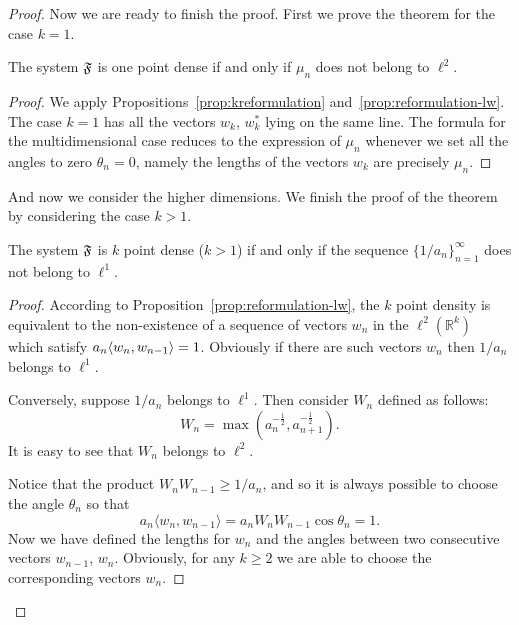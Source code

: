 \begin{proof}
    Now we are ready to finish the proof.
    First we prove the theorem for the case $k=1$.
    \begin{prop}
      The system $\mathfrak{F}$ is one point dense if and only if $\mu_n$ does not belong to $\ell^2$.
    \end{prop}
    \begin{proof}
      We apply Propositions~\ref{prop:kreformulation} and~\ref{prop:reformulation-lw}.
      The case $k=1$ has all the vectors $w_k$, $w^*_k$ lying on the same line.
      The formula for the multidimensional case reduces to the expression of $\mu_n$ whenever we set all the angles to zero $\theta_n = 0$,
        namely the lengths of the vectors $w_k$ are precisely $\mu_n$.
    \end{proof}

    And now we consider the higher dimensions.
    We finish the proof of the theorem by considering the case $k > 1$.
    \begin{prop}
      The system $\mathfrak{F}$ is $k$ point dense ($k > 1$) if and only if the sequence $\{1/a_n\}_{n=1}^\infty$ does not belong to $\ell^1$.
    \end{prop}
    \begin{proof}
      According to Proposition~\ref{prop:reformulation-lw}, the $k$ point density is equivalent to the non-existence of
        a sequence of vectors $w_n$ in the $\ell^2(\mathbb{R}^k)$ which satisfy $a_n \langle w_n, w_{n-1} \rangle = 1$.
      Obviously if there are such vectors $w_n$ then $1/a_n$ belongs to $\ell^1$.

      Conversely, suppose $1/a_n$ belongs to $\ell^1$.
      Then consider $W_n$ defined as follows:
      \[
        W_n = \max(a_n^{-\frac{1}{2}}, a^{-\frac{1}{2}}_{n+1}).
      \]
      It is easy to see that $W_n$ belongs to $\ell^2$.

      Notice that the product $W_nW_{n-1} \geq 1/a_n$, and so it is always possible to choose the angle $\theta_n$ so that
      \[
        a_n \langle w_n, w_{n-1} \rangle = a_n W_n W_{n-1}\cos{\theta_n} = 1.
      \]
      Now we have defined the lengths for $w_n$ and the angles between two consecutive vectors $w_{n-1}$, $w_n$.
      Obviously, for any $k \geq 2$ we are able to choose the corresponding vectors $w_n$.
    \end{proof}
  \end{proof}
